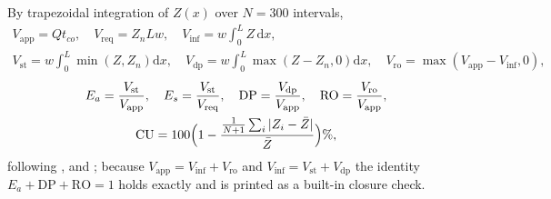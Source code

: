 By trapezoidal integration of $Z(x)$ over $N=300$ intervals,
\begin{equation}
\begin{gathered}V_{\mathrm{app}}=Qt_{co},\quad V_{\mathrm{req}}=Z_nLw,\quad V_{\mathrm{inf}}=w\!\!\int_0^L\!\!Z\,\mathrm dx,\\ V_{\mathrm{st}}=w\!\!\int_0^L\!\!\min(Z,Z_n)\mathrm dx,\quad V_{\mathrm{dp}}=w\!\!\int_0^L\!\!\max(Z-Z_n,0)\mathrm dx,\quad V_{\mathrm{ro}}=\max(V_{\mathrm{app}}-V_{\mathrm{inf}},0),\end{gathered}
\label{eq:vols}
\end{equation}
\begin{equation}
\begin{gathered}E_a=\frac{V_{\mathrm{st}}}{V_{\mathrm{app}}},\quad E_s=\frac{V_{\mathrm{st}}}{V_{\mathrm{req}}},\quad \mathrm{DP}=\frac{V_{\mathrm{dp}}}{V_{\mathrm{app}}},\quad \mathrm{RO}=\frac{V_{\mathrm{ro}}}{V_{\mathrm{app}}},\\ \mathrm{CU}=100\Bigl(1-\frac{\frac1{N+1}\sum_i|Z_i-\bar Z|}{\bar Z}\Bigr)\%,\end{gathered}
\label{eq:eff}
\end{equation}
following \citet{Walker1987}, \citet{Burt1997} and \citet{Christiansen1942}; because $V_{\mathrm{app}}=V_{\mathrm{inf}}+V_{\mathrm{ro}}$ and $V_{\mathrm{inf}}=V_{\mathrm{st}}+V_{\mathrm{dp}}$ the identity $E_a+\mathrm{DP}+\mathrm{RO}=1$ holds exactly and is printed as a built-in closure check.


